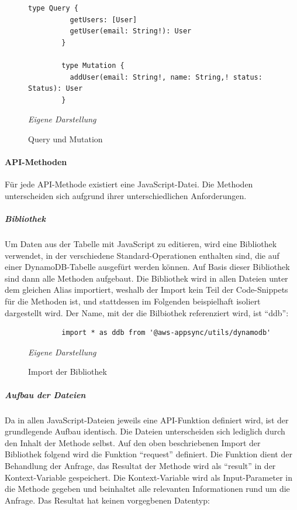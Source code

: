 		\begin{figure}[H]
		\centering
		\begin{minipage}[t]{.7\textwidth} %
		\caption{Query und Mutation} %
		\begin{lstlisting}[style=graphql]
		type Query {
		  getUsers: [User]
		  getUser(email: String!): User
		}
		
		type Mutation {
		  addUser(email: String!, name: String,! status: Status): User
		}
		\end{lstlisting}
		\textit{Eigene Darstellung} %
		\label{fig:queryAndMutation}
		\end{minipage}
		\end{figure}
	
	
	\paragraph{API-Methoden}
	Für jede API-Methode existiert eine JavaScript-Datei. Die Methoden unterscheiden sich aufgrund ihrer unterschiedlichen Anforderungen.
	\subparagraph{Bibliothek}
	Um Daten aus der Tabelle mit JavaScript zu editieren, wird eine Bibliothek verwendet, in der verschiedene Standard-Operationen enthalten sind, die auf einer DynamoDB-Tabelle ausgefürt werden können. Auf Basis dieser Bibliothek sind dann alle Methoden aufgebaut. Die Bibliothek wird in allen Dateien unter dem gleichen Alias importiert, weshalb der Import kein Teil der Code-Snippets für die Methoden ist, und stattdessen im Folgenden beispielhaft isoliert dargestellt wird. Der Name, mit der die Bilbiothek referenziert wird, ist ``ddb'':\newline
		\begin{figure}[H]
		\centering
		\begin{minipage}[t]{.7\textwidth} %
		\caption{Import der Bibliothek} %
		\begin{verbatim}
		import * as ddb from '@aws-appsync/utils/dynamodb'
		\end{verbatim}
		
		\textit{Eigene Darstellung} %
		\label{fig:bibliothekImport}
		\end{minipage}
		\end{figure}
	\subparagraph{Aufbau der Dateien}
	Da in allen JavaScript-Dateien jeweils eine API-Funktion definiert wird, ist der grundlegende Aufbau identisch. Die Dateien unterscheiden sich lediglich durch den Inhalt der Methode selbst. 
	Auf den oben beschriebenen Import der Bibliothek folgend wird die Funktion ``request'' definiert. Die Funktion dient der Behandlung der Anfrage, das Resultat der Methode wird als ``result'' in der Kontext-Variable gespeichert. Die Kontext-Variable wird als Input-Parameter in die Methode gegeben und beinhaltet alle relevanten Informationen rund um die Anfrage. Das Resultat hat keinen vorgegbenen Datentyp:\newline
